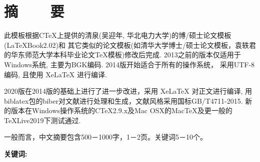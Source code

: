 \thispagestyle{fancy}
\renewcommand{\baselinestretch}{1.8}

\chapter*{摘~~~~要}

此模板根据CTeX上提供的清泉(吴迎年, 华北电力大学)的博/硕士论文模板(LaTeXBook2.02)和
其它类似的论文模板(如清华大学博士/硕士论文模板，袁轶君的华东师范大学本科毕业论文\TeX{}模板)修改后完成. 2013之前的版本仅适用于Windows系统, 主要为BGK编码. 2014版开始适合于所有的操作系统， 采用UTF-8编码, 且使用 XeLaTeX 进行编译. 

2020版在2014版的基础上进行了进一步改进，采用 XeLaTeX 对正文进行编译, 用biblatex包的biber对文献进行处理和生成，文献风格采用国标GB/T4711-2015.  
新的版本在Windows操作系统的CTeX2.9.x及Mac OSX的MacTeX及更一般的TeXLive2019下测试通过. 

一般而言，中文摘要包含500－1000字，1－2页。关键词5－10个。

\vspace{1em}
\noindent 
\textbf{关键词:} \rmfamily \KeywordsCHS
